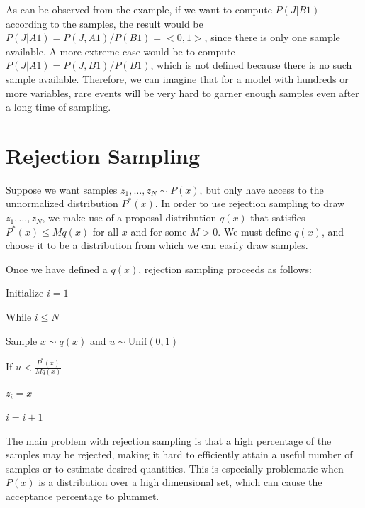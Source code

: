 \documentclass[twoside]{article}
\begin{document}
As can be observed from the example, if we want to compute $P(J|B1)$ according to the samples, the result would be $P(J|A1) = P(J,A1)/P(B1)= <0,1>$, since there is only one sample available. A more extreme case would be to compute $P(J|A1)=P(J,B1)/P(B1)$, which is not defined because there is no such sample available. Therefore, we can imagine that for a model with hundreds or more variables, rare events will be very hard to garner enough samples even after a long time of sampling.

\section{Rejection Sampling}
Suppose we want samples $z_1,\ldots,z_N \sim P(x)$, but only have access to the unnormalized distribution $P^*(x)$. In order to use rejection sampling to draw $z_1,\ldots,z_N$, we make use of a proposal distribution $q(x)$ that satisfies $P^*(x) \leq Mq(x)$ for all $x$ and for some $M>0$. We must define $q(x)$, and choose it to be a distribution from which we can easily draw samples. 

Once we have defined a $q(x)$, rejection sampling proceeds as follows:
\begin{enumerate*}
    \item Initialize $i=1$
    \item While $i \leq N$
    \begin{enumerate*}
        \item Sample $x \sim q(x)$ and $u \sim \text{Unif}(0,1)$
        \item If $u < \frac{P^*(x)}{Mq(x)}$
        \begin{enumerate*}
            \item $z_i = x$
            \item $i = i+1$
        \end{enumerate*}
    \end{enumerate*}
\end{enumerate*}

The main problem with rejection sampling is that a high percentage of the samples may be rejected, making it hard to efficiently attain a useful number of samples or to estimate desired quantities. This is especially problematic when $P(x)$ is a distribution over a high dimensional set, which can cause the acceptance percentage to plummet.
\end{document}
